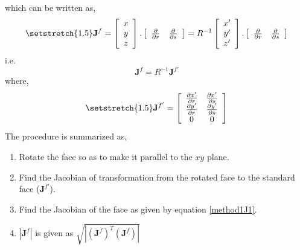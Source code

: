  which can be written as,
 \begin{equation}\label{method1J}
	 {\setstretch{1.5}
	 \mathbf{J}^f = 
	 \left[\begin{array}{c}
			  x  \\
			  y  \\
			  z  \\
	  \end{array} \right]. 
	  \left[\begin{array}{c c} 
		  \frac{\partial}{\partial r} &  \frac{\partial}{\partial s}\\
		  \end{array} \right]
		  = R^{-1}
	 \left[\begin{array}{c}
			  x'  \\
			  y'  \\
			  z'  \\
	  \end{array} \right]. 
	  \left[\begin{array}{c c} 
		  \frac{\partial}{\partial r} &  \frac{\partial}{\partial s}\\
		  \end{array} \right]
 }
 \end{equation}
i.e.
\begin{equation}\label{method1J1}
	\mathbf{J}^f = R^{-1} \mathbf{J}^{f'}
\end{equation}
where,
\begin{equation}\label{method1J'}
        {\setstretch{1.5}
		\mathbf{J}^{f'} = 
        \left[\begin{array}{c c}
       		 \frac{\partial x'}{\partial r}  & \frac{\partial x'}{\partial s}  \\
       		 \frac{\partial y'}{\partial r}  & \frac{\partial y'}{\partial s}  \\
				0		 &             0		   \\
        \end{array} \right]
}
\end{equation}
The procedure is summarized as,
\begin{enumerate}
        \item Rotate the face so as to make it parallel to the $xy$ plane.
	\item Find the Jacobian of transformation from the rotated face to the standard face ($\mathbf{J}^{f'}$).
	\item Find the Jacobian of the face as given by equation \ref{method1J1}.
	\item $|\mathbf{J}^{f}|$ is given as $\sqrt{|\left(\mathbf{J}^{f}\right)^{T}\left(\mathbf{J}^{f}\right)|}$
\end{enumerate}

